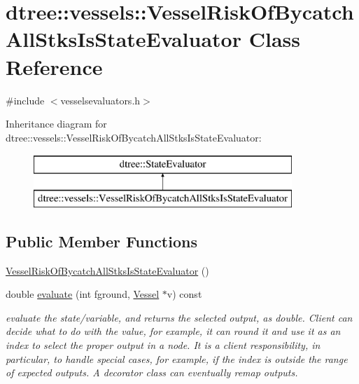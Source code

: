 \hypertarget{classdtree_1_1vessels_1_1_vessel_risk_of_bycatch_all_stks_is_state_evaluator}{}\section{dtree\+::vessels\+::Vessel\+Risk\+Of\+Bycatch\+All\+Stks\+Is\+State\+Evaluator Class Reference}
\label{classdtree_1_1vessels_1_1_vessel_risk_of_bycatch_all_stks_is_state_evaluator}


{\ttfamily \#include $<$vesselsevaluators.\+h$>$}

Inheritance diagram for dtree\+::vessels\+::Vessel\+Risk\+Of\+Bycatch\+All\+Stks\+Is\+State\+Evaluator\+:\begin{figure}[H]
\begin{center}
\leavevmode
\includegraphics[height=2.000000cm]{d6/d67/classdtree_1_1vessels_1_1_vessel_risk_of_bycatch_all_stks_is_state_evaluator}
\end{center}
\end{figure}
\subsection*{Public Member Functions}
\begin{DoxyCompactItemize}
\item 
\mbox{\hyperlink{classdtree_1_1vessels_1_1_vessel_risk_of_bycatch_all_stks_is_state_evaluator_a857f13bfb8dd15272b914929e0d56e0f}{Vessel\+Risk\+Of\+Bycatch\+All\+Stks\+Is\+State\+Evaluator}} ()
\item 
double \mbox{\hyperlink{classdtree_1_1vessels_1_1_vessel_risk_of_bycatch_all_stks_is_state_evaluator_afcb57e2105f10d85e9f6955762064046}{evaluate}} (int fground, \mbox{\hyperlink{class_vessel}{Vessel}} $\ast$v) const
\begin{DoxyCompactList}\small\item\em evaluate the state/variable, and returns the selected output, as double. Client can decide what to do with the value, for example, it can round it and use it as an index to select the proper output in a node. It is a client responsibility, in particular, to handle special cases, for example, if the index is outside the range of expected outputs. A decorator class can eventually remap outputs. \end{DoxyCompactList}\end{DoxyCompactItemize}


